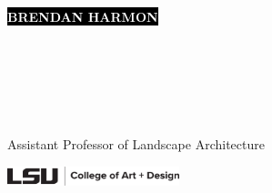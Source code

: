 \documentclass[10pt]{developercv} %
\begin{document}

\begin{minipage}[t]{0.475\textwidth} %
	\vspace{-\baselineskip} %
	\colorbox{black}{{\huge\textcolor{white}{\textbf{\MakeUppercase{Brendan Harmon}}}}} 
	
\end{minipage}
\begin{minipage}[t]{0.25\textwidth}
	\vspace{-\baselineskip} 
	\\
	\\
	
\end{minipage}
\begin{minipage}[t]{0.25\textwidth}
	\vspace{-\baselineskip}
	\\	
	\\
\end{minipage}

\vspace{6pt}

{\Large Assistant Professor of Landscape Architecture \par} 

\vspace{6pt}

\includegraphics[width=5cm]{images/lsu_art_design_logo.pdf}

\vspace{6pt}

\end{document}
